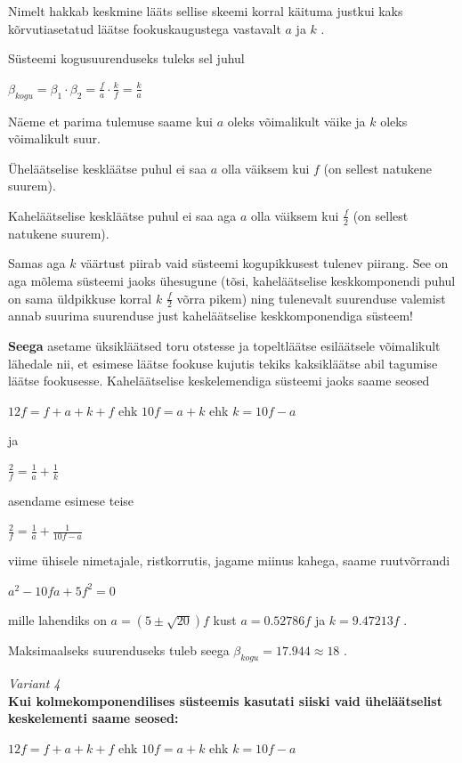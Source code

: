 Nimelt hakkab keskmine lääts sellise skeemi korral käituma justkui kaks kõrvutiasetatud läätse fookuskaugustega vastavalt $ a $ ja $ k $ .

Süsteemi kogusuurenduseks tuleks sel juhul

 $ {\beta}_{kogu} = {\beta}_1 \cdot {\beta}_2 = \frac {f} {a} \cdot \frac {k} {f} = \frac {k}{a}$

Näeme et parima tulemuse saame kui $a$ oleks võimalikult väike ja $k$ oleks võimalikult suur.

Üheläätselise keskläätse puhul ei saa  $a$ olla väiksem kui $f$ (on sellest natukene suurem).

Kaheläätselise keskläätse puhul ei saa aga $a$ olla väiksem kui $ \frac {f}{2}$ (on sellest natukene suurem).

Samas aga $k$ väärtust piirab vaid süsteemi kogupikkusest tulenev piirang. See on aga mõlema süsteemi jaoks ühesugune (tõsi, kaheläätselise keskkomponendi puhul on sama üldpikkuse korral $k$ $ \frac{f}{2}$ võrra pikem) ning tulenevalt suurenduse valemist annab  suurima suurenduse just kaheläätselise keskkomponendiga süsteem!

\textbf{Seega} asetame üksikläätsed toru otstesse ja topeltläätse esiläätsele võimalikult lähedale nii, et esimese läätse fookuse kujutis tekiks kaksikläätse abil tagumise läätse fookusesse.
Kaheläätselise keskelemendiga süsteemi jaoks saame seosed

$ 12f = f + a + k + f $ ehk $ 10f = a + k $ ehk $ k = 10f - a $

ja

$ \frac{2}{f} = \frac{1}{a} + \frac{1}{k} $

asendame esimese teise

$ \frac {2}{f} = \frac {1}{a} + \frac {1}{10f - a} $

viime ühisele nimetajale, ristkorrutis, jagame miinus kahega, saame ruutvõrrandi

$ a^2 - 10fa + 5f^2 =0 $

mille lahendiks on $ a = (5 \pm \sqrt{20}) f $ kust $a=0.52786f $ ja $k=9.47213f$ .

Maksimaalseks suurenduseks tuleb seega $ {\beta}_{kogu} = 17.944 \approx 18 $ .


\emph{Variant 4}\\
\textbf {Kui kolmekomponendilises süsteemis kasutati siiski vaid üheläätselist keskelementi saame seosed:}

$ 12f = f + a + k + f $ ehk $ 10f = a + k $ ehk $ k = 10f - a $

